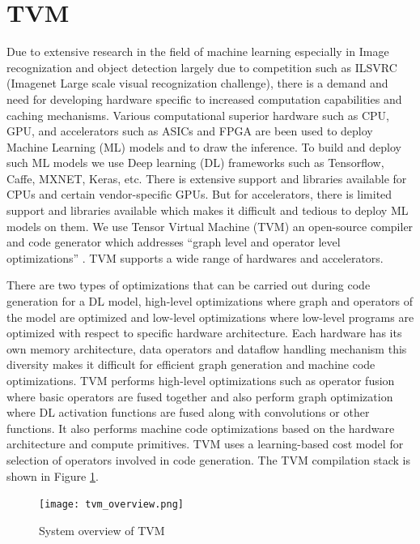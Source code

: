 \section{TVM}
Due to extensive research in the field of machine learning especially in Image recognization and object detection largely due to competition such as ILSVRC (Imagenet Large scale visual recognization challenge), there is a demand and need for developing hardware specific to increased computation capabilities and caching mechanisms. Various computational superior hardware such as CPU, GPU, and accelerators such as ASICs and FPGA are been used to deploy Machine Learning (ML) models and to draw the inference. To build and deploy such ML models we use Deep learning (DL) frameworks such as Tensorflow, Caffe, MXNET, Keras, etc. There is extensive support and libraries available for CPUs and certain vendor-specific GPUs. But for accelerators, there is limited support and libraries available which makes it difficult and tedious to deploy ML models on them.  We use Tensor Virtual Machine (TVM) an open-source compiler and code generator which addresses “graph level and operator level optimizations” \cite{tvm_fig}. TVM supports a wide range of hardwares and accelerators. 

There are two types of optimizations that can be carried out during code generation for a DL model, high-level optimizations where graph and operators of the model are optimized and low-level optimizations where low-level programs are  optimized with respect to specific hardware architecture.
Each hardware has its own memory architecture, data operators and dataflow handling mechanism this diversity makes it difficult for efficient graph generation and machine code optimizations.
TVM performs high-level optimizations such as operator fusion where basic operators are fused together and also perform graph optimization where DL activation functions are fused along with convolutions or other functions. It also performs machine code optimizations based on the hardware architecture and compute primitives. TVM uses a learning-based cost model for selection of operators involved in code generation. The TVM compilation stack is shown in Figure \ref{fig:tvm_fig}.

\begin{figure}[h!]
    \centering
    \texttt{[image: tvm\_overview.png]}
    \caption{System overview of TVM \cite{tvm_fig}}
    \label{fig:tvm_fig}
\end{figure} 

